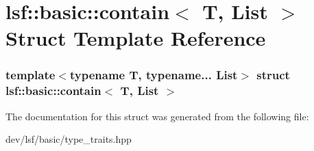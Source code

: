\hypertarget{structlsf_1_1basic_1_1contain}{
\section{lsf::basic::contain$<$ T, List $>$ Struct Template Reference}
\label{structlsf_1_1basic_1_1contain}
}
\subsubsection*{template$<$typename T, typename... List$>$ struct lsf::basic::contain$<$ T, List $>$}



The documentation for this struct was generated from the following file:\begin{DoxyCompactItemize}
\item 
dev/lsf/basic/type\_\-traits.hpp\end{DoxyCompactItemize}
